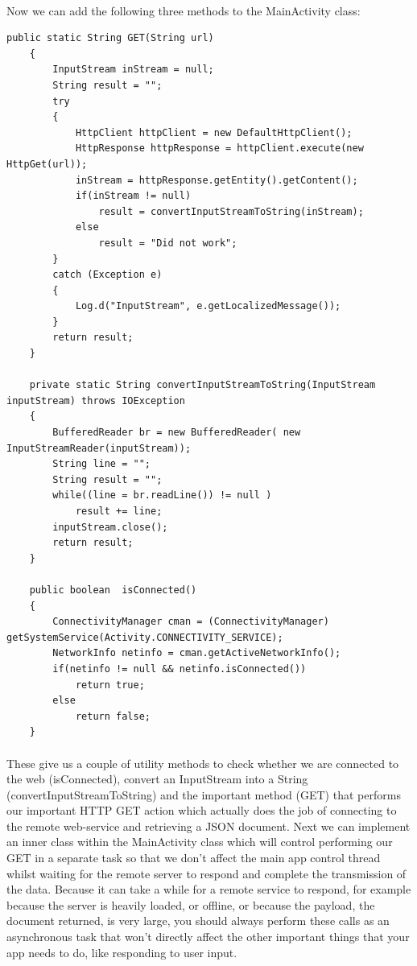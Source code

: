 \paragraph{} Now we can add the following three methods to the MainActivity class:

\begin{lstlisting}
public static String GET(String url)
    {
        InputStream inStream = null;
        String result = "";
        try
        {
            HttpClient httpClient = new DefaultHttpClient();
            HttpResponse httpResponse = httpClient.execute(new HttpGet(url));
            inStream = httpResponse.getEntity().getContent();
            if(inStream != null)
                result = convertInputStreamToString(inStream);
            else
                result = "Did not work";
        }
        catch (Exception e)
        {
            Log.d("InputStream", e.getLocalizedMessage());
        }
        return result;
    }

    private static String convertInputStreamToString(InputStream inputStream) throws IOException
    {
        BufferedReader br = new BufferedReader( new InputStreamReader(inputStream));
        String line = "";
        String result = "";
        while((line = br.readLine()) != null )
            result += line;
        inputStream.close();
        return result;
    }

    public boolean  isConnected()
    {
        ConnectivityManager cman = (ConnectivityManager) getSystemService(Activity.CONNECTIVITY_SERVICE);
        NetworkInfo netinfo = cman.getActiveNetworkInfo();
        if(netinfo != null && netinfo.isConnected())
            return true;
        else
            return false;
    }
\end{lstlisting}

\paragraph{} These give us a couple of utility methods to check whether we are connected to the web (isConnected), convert an InputStream into a String (convertInputStreamToString) and the important method (GET) that performs our important HTTP GET action which actually does the job of connecting to the remote web-service and retrieving a JSON document. Next we can implement an inner class within the MainActivity class which will control performing our GET in a separate task so that we don't affect the main app control thread whilst waiting for the remote server to respond and complete the transmission of the data. Because it can take a while for a remote service to respond, for example because the server is heavily loaded, or offline, or because the payload, the document returned, is very large, you should always perform these calls as an asynchronous task that won't directly affect the other important things that your app needs to do, like responding to user input.

